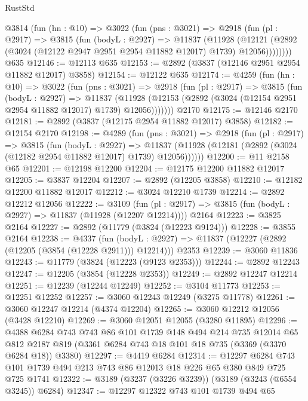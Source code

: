 \begin{lexlean}{RustStd}
\begin{coremodule}
    @3814
      (fun (hn : @10) =>
      @3022
        (fun (pns : @3021) =>
        @2918
          (fun (pl : @2917) =>
          @3815
            (fun (bodyL : @2927) =>
            @11837
              (@11928
                (@12121 (@2892 (@3024 (@12122 @2947 @2951 @2954 @11882 @12017) @1739) @12056))))))))
    @635
@12146 := @12113 @635
@12153 := @2892 (@3837 (@12146 @2951 @2954 @11882 @12017) @3858)
@12154 := @12122 @635
@12174 := @4259
    (fun (hn : @10) =>
    @3022
      (fun (pns : @3021) =>
      @2918
        (fun (pl : @2917) =>
        @3815
          (fun (bodyL : @2927) =>
          @11837
            (@11928 (@12153 (@2892 (@3024 (@12154 @2951 @2954 @11882 @12017) @1739) @12056)))))))
    @2170
@12175 := @12146 @2170
@12181 := @2892 (@3837 (@12175 @2954 @11882 @12017) @3858)
@12182 := @12154 @2170
@12198 := @4289
    (fun (pns : @3021) =>
    @2918
      (fun (pl : @2917) =>
      @3815
        (fun (bodyL : @2927) =>
        @11837 (@11928 (@12181 (@2892 (@3024 (@12182 @2954 @11882 @12017) @1739) @12056))))))
@12200 := @11 @2158 @65
@12201 := @12198 @12200
@12204 := @12175 @12200 @11882 @12017
@12205 := @3837 @12204
@12207 := @2892 (@12205 @3858)
@12210 := @12182 @12200 @11882 @12017
@12212 := @3024 @12210 @1739
@12214 := @2892 @12212 @12056
@12222 := @3109
    (fun (pl : @2917) => @3815 (fun (bodyL : @2927) => @11837 (@11928 (@12207 @12214))))
    @2164
@12223 := @3825 @2164
@12227 := @2892 (@11779 (@3824 (@12223 @9124)))
@12228 := @3855 @2164
@12238 := @4337
    (fun (bodyL : @2927) => @11837 (@12227 (@2892 (@12205 (@3854 (@12228 @2911))) @12214)))
    @2353
@12239 := @3060 @11836
@12243 := @11779 (@3824 (@12223 (@9123 @2353)))
@12244 := @2892 @12243
@12247 := @12205 (@3854 (@12228 @2353))
@12249 := @2892 @12247 @12214
@12251 := @12239 (@12244 @12249)
@12252 := @3104 @11773
@12253 := @12251 @12252
@12257 := @3060 @12243 @12249 (@3275 @11778)
@12261 := @3060 @12247 @12214 (@4374 @12204)
@12265 := @3060 @12212 @12056 (@3428 @12210)
@12269 := @3060 @12051 @12055 (@3280 @11895)
@12296 := @4388
    @6284
    @743
    @743
    @86
    @101
    @1739
    @148
    @494
    @214
    @735
    @12014
    @65
    @812
    @2187
    @819
    (@3361 @6284 @743 @18 @101 @18 @735 (@3369 (@3370 @6284 @18)) @3380)
@12297 := @4419 @6284
@12314 := @12297
    @6284
    @743
    @101
    @1739
    @494
    @213
    @743
    @86
    @12013
    @18
    @226
    @65
    @380
    @849
    @725
    @725
    @1741
@12322 := @3189 (@3237 (@3226 @3239)) (@3189 (@3243 (@6554 @3245)) @6284)
@12347 := @12297
    @12322
    @743
    @101
    @1739
    @494
    @65

\end{coremodule}
\end{lexlean}
